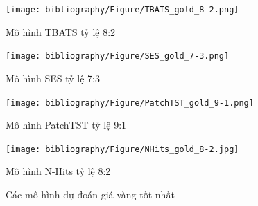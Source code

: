 \documentclass[conference]{IEEEtran}
\begin{document}
\begin{figure}[t]
\begin{minipage}{0.5\textwidth}
\begin{minipage}{0.45\textwidth}
            \centering
            \texttt{[image: bibliography/Figure/TBATS\_gold\_8-2.png]} 
            \caption{Mô hình TBATS tỷ lệ 8:2}
        \end{minipage}
        \hfill
        \begin{minipage}{0.45\textwidth}
            \centering
            \texttt{[image: bibliography/Figure/SES\_gold\_7-3.png]} 
            \caption{Mô hình SES tỷ lệ 7:3}
        \end{minipage}
        \hfill
        \begin{minipage}{0.45\textwidth}
            \centering
            \texttt{[image: bibliography/Figure/PatchTST\_gold\_9-1.png]} 
            \caption{Mô hình PatchTST tỷ lệ 9:1}
        \end{minipage}
        \begin{minipage}{0.45\textwidth}
            \centering
            \texttt{[image: bibliography/Figure/NHits\_gold\_8-2.jpg]} 
            \caption{Mô hình N-Hits tỷ lệ 8:2}
        \end{minipage}
    \end{minipage}
    \caption{Các mô hình dự đoán giá vàng tốt nhất}
    \label{fig:gold-images}
\end{figure}
\end{document}
